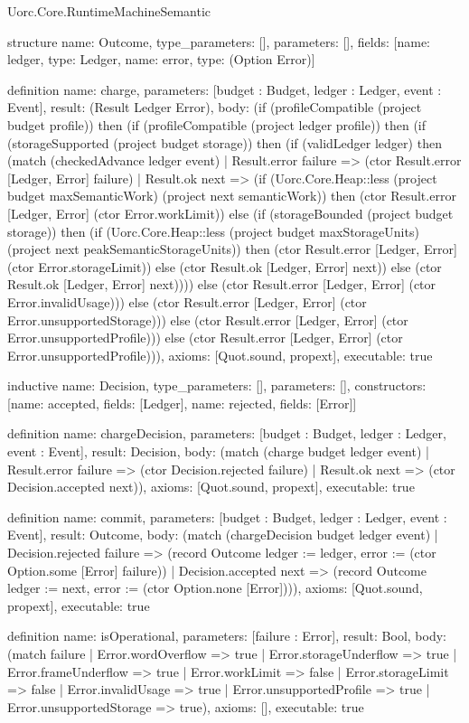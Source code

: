 \begin{lexlean}{Uorc.Core.RuntimeMachineSemantic}
\begin{semanticmodule}
structure{
  name: Outcome,
  type_parameters: [],
  parameters: [],
  fields: [{name: ledger, type: Ledger}, {name: error, type: (Option Error)}]
}

definition{
  name: charge,
  parameters: [budget : Budget, ledger : Ledger, event : Event],
  result: (Result Ledger Error),
  body: (if (profileCompatible (project budget profile)) then (if (profileCompatible (project ledger profile)) then (if (storageSupported (project budget storage)) then (if (validLedger ledger) then (match (checkedAdvance ledger event)
    | Result.error failure => (ctor Result.error [Ledger, Error] failure)
    | Result.ok next => (if (Uorc.Core.Heap::less (project budget maxSemanticWork) (project next semanticWork)) then (ctor Result.error [Ledger, Error] (ctor Error.workLimit)) else (if (storageBounded (project budget storage)) then (if (Uorc.Core.Heap::less (project budget maxStorageUnits) (project next peakSemanticStorageUnits)) then (ctor Result.error [Ledger, Error] (ctor Error.storageLimit)) else (ctor Result.ok [Ledger, Error] next)) else (ctor Result.ok [Ledger, Error] next)))) else (ctor Result.error [Ledger, Error] (ctor Error.invalidUsage))) else (ctor Result.error [Ledger, Error] (ctor Error.unsupportedStorage))) else (ctor Result.error [Ledger, Error] (ctor Error.unsupportedProfile))) else (ctor Result.error [Ledger, Error] (ctor Error.unsupportedProfile))),
  axioms: [Quot.sound, propext],
  executable: true
}

inductive{
  name: Decision,
  type_parameters: [],
  parameters: [],
  constructors: [{name: accepted, fields: [Ledger]}, {name: rejected, fields: [Error]}]
}

definition{
  name: chargeDecision,
  parameters: [budget : Budget, ledger : Ledger, event : Event],
  result: Decision,
  body: (match (charge budget ledger event)
    | Result.error failure => (ctor Decision.rejected failure)
    | Result.ok next => (ctor Decision.accepted next)),
  axioms: [Quot.sound, propext],
  executable: true
}

definition{
  name: commit,
  parameters: [budget : Budget, ledger : Ledger, event : Event],
  result: Outcome,
  body: (match (chargeDecision budget ledger event)
    | Decision.rejected failure => (record Outcome {ledger := ledger, error := (ctor Option.some [Error] failure)})
    | Decision.accepted next => (record Outcome {ledger := next, error := (ctor Option.none [Error])})),
  axioms: [Quot.sound, propext],
  executable: true
}

definition{
  name: isOperational,
  parameters: [failure : Error],
  result: Bool,
  body: (match failure
    | Error.wordOverflow => true
    | Error.storageUnderflow => true
    | Error.frameUnderflow => true
    | Error.workLimit => false
    | Error.storageLimit => false
    | Error.invalidUsage => true
    | Error.unsupportedProfile => true
    | Error.unsupportedStorage => true),
  axioms: [],
  executable: true
}


\end{semanticmodule}
\end{lexlean}
